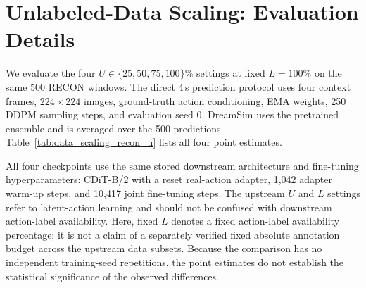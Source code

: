 \section{Unlabeled-Data Scaling: Evaluation Details}
\label{app:data_scaling}

We evaluate the four $U\in\{25,50,75,100\}\%$ settings at fixed
$L=100\%$ on the same 500 RECON windows. The direct 4\,s prediction
protocol uses four context frames, $224\times224$ images, ground-truth
action conditioning, EMA weights, 250 DDPM sampling steps, and evaluation
seed 0. DreamSim uses the pretrained ensemble and is averaged over the
500 predictions. Table~\ref{tab:data_scaling_recon_u} lists all four
point estimates.

All four checkpoints use the same stored downstream architecture and
fine-tuning hyperparameters: CDiT-B/2 with a reset real-action adapter,
1,042 adapter warm-up steps, and 10,417 joint fine-tuning steps.
The upstream $U$ and $L$ settings refer to latent-action learning and
should not be confused with downstream action-label availability.
Here, fixed $L$ denotes a fixed action-label availability percentage;
it is not a claim of a separately verified fixed absolute annotation
budget across the upstream data subsets.
Because the comparison has no independent training-seed repetitions,
the point estimates do not establish the statistical significance of
the observed differences.


